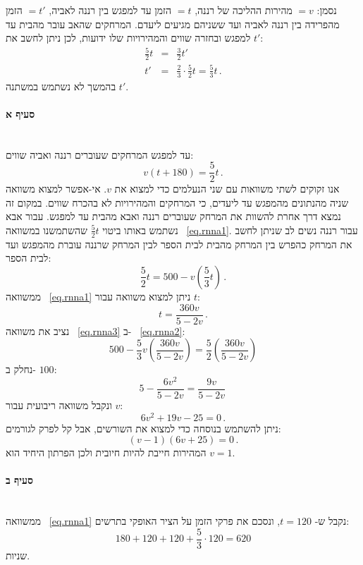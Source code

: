 \documentclass[12pt,a4paper]{article}
\begin{document}
נסמן:
$=v$
מהירות ההליכה של רננה,
$=t$
הזמן עד למפגש בין רננה לאביה,
$=t'$
הזמן מהפרידה בין רננה לאביה ועד ששניהם מגיעים ליעדם. המרחקים שהאב עובר מהבית עד למפגש ובחזרה שווים והמהירויות שלו ידועות, לכן ניתן לחשב את
$t'$:
\begin{eqnarray*}
\frac{5}{2}t &=& \frac{3}{2}t'\\
t' &=& \frac{2}{3}\cdot\frac{5}{2}t = \frac{5}{3}t\,.
\end{eqnarray*}
בהמשך לא נשתמש במשתנה
$t'$.

\paragraph{סעיף א}\mbox{}\\

עד למפגש המרחקים שעוברים רננה ואביה שווים:
\begin{equation}
v(t+180) = \frac{5}{2}t\,.\label{eq.rnna1}
\end{equation}
אנו זקוקים לשתי משוואות עם שני הנעלמים כדי למצוא את
$v$.
אי-אפשר למצוא משוואה שניה מהנתונים מהמפגש עד ליעדים, כי המרחקים והמהירויות לא בהכרח שווים. במקום זה נמצא דרך אחרת להשוות את המרחק שעוברים רננה ואבא מהבית עד למפגש. עבור אבא נשתמש באותו ביטוי 
$\frac{5}{2}t$
שהשתמשנו במשוואה%
~\ref{eq.rnna1}.
עבור רננה נשים לב שניתן לחשב את המרחק כהפרש בין המרחק מהבית לבית הספר לבין המרחק שרננה עוברת מהמפגש ועד לבית הספר:
\begin{equation}
\frac{5}{2}t = 500 - v\left(\frac{5}{3}t\right)\,.\label{eq.rnna2}
\end{equation}
ממשוואה%
~\ref{eq.rnna1}
ניתן למצוא משוואה עבור 
$t$:
\begin{equation}
t = \frac{360v}{5-2v}\,.\label{eq.rnna3}
\end{equation}
נציב את משוואה%
~\ref{eq.rnna3}
ב-%
~\ref{eq.rnna2}:
\[
500 - \frac{5}{3}v\left(\frac{360v}{5-2v}\right) = \frac{5}{2} \left(\frac{360v}{5-2v}\right)
\]
נחלק ב-%
$100$:
\[
5 - \frac{6v^2}{5-2v} = \frac{9v}{5-2v}\,
\]
ונקבל משוואה ריבועית עבור
$v$:
\[
6v^2 + 19v - 25 = 0\,.
\]
ניתן להשתמש בנוסחה כדי למצוא את השורשים, אבל קל לפרק לגורמים:
\[
(v-1)(6v+25)=0\,.
\]
המהירות חייבת להיות חיובית ולכן הפרתון היחיד הוא
$v=1$.

\paragraph{סעיף ב}\mbox{}\\

ממשוואה%
~\ref{eq.rnna1}
נקבל ש-%
$t=120$,
ונסכם את פרקי הזמן על הציר האופקי בתרשים:
\[
180 + 120 + 120 + \frac{5}{3}\cdot 120 = 620
\]
שניות.
\end{document}
